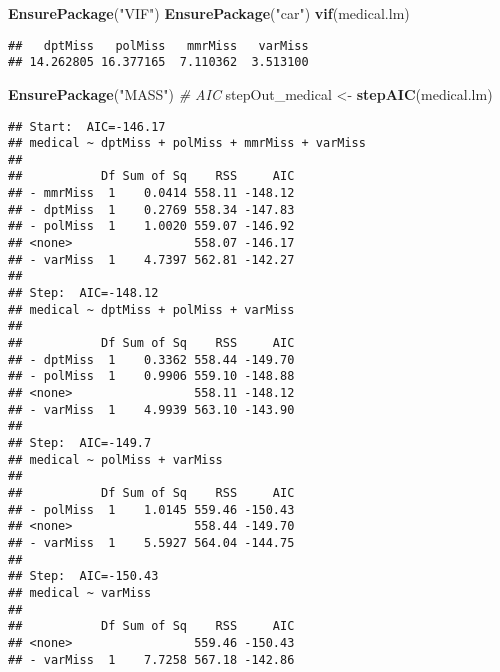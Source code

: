 \documentclass[]{article}
\newenvironment{Shaded}{\begin{snugshade}}{\end{snugshade}}
\newcommand{\CommentTok}[1]{\textcolor[rgb]{0.56,0.35,0.01}{\textit{#1}}}
\newcommand{\KeywordTok}[1]{\textcolor[rgb]{0.13,0.29,0.53}{\textbf{#1}}}
\newcommand{\NormalTok}[1]{#1}
\newcommand{\OperatorTok}[1]{\textcolor[rgb]{0.81,0.36,0.00}{\textbf{#1}}}
\newcommand{\StringTok}[1]{\textcolor[rgb]{0.31,0.60,0.02}{#1}}
\begin{document}
\begin{Shaded}
\begin{Highlighting}[]
\KeywordTok{EnsurePackage}\NormalTok{(}\StringTok{"VIF"}\NormalTok{)}
\KeywordTok{EnsurePackage}\NormalTok{(}\StringTok{"car"}\NormalTok{)}
\KeywordTok{vif}\NormalTok{(medical.lm)}
\end{Highlighting}
\end{Shaded}

\begin{verbatim}
##   dptMiss   polMiss   mmrMiss   varMiss 
## 14.262805 16.377165  7.110362  3.513100
\end{verbatim}

\begin{Shaded}
\begin{Highlighting}[]
\KeywordTok{EnsurePackage}\NormalTok{(}\StringTok{"MASS"}\NormalTok{) }\CommentTok{# AIC}
\NormalTok{stepOut_medical <-}\StringTok{ }\KeywordTok{stepAIC}\NormalTok{(medical.lm)}
\end{Highlighting}
\end{Shaded}

\begin{verbatim}
## Start:  AIC=-146.17
## medical ~ dptMiss + polMiss + mmrMiss + varMiss
## 
##           Df Sum of Sq    RSS     AIC
## - mmrMiss  1    0.0414 558.11 -148.12
## - dptMiss  1    0.2769 558.34 -147.83
## - polMiss  1    1.0020 559.07 -146.92
## <none>                 558.07 -146.17
## - varMiss  1    4.7397 562.81 -142.27
## 
## Step:  AIC=-148.12
## medical ~ dptMiss + polMiss + varMiss
## 
##           Df Sum of Sq    RSS     AIC
## - dptMiss  1    0.3362 558.44 -149.70
## - polMiss  1    0.9906 559.10 -148.88
## <none>                 558.11 -148.12
## - varMiss  1    4.9939 563.10 -143.90
## 
## Step:  AIC=-149.7
## medical ~ polMiss + varMiss
## 
##           Df Sum of Sq    RSS     AIC
## - polMiss  1    1.0145 559.46 -150.43
## <none>                 558.44 -149.70
## - varMiss  1    5.5927 564.04 -144.75
## 
## Step:  AIC=-150.43
## medical ~ varMiss
## 
##           Df Sum of Sq    RSS     AIC
## <none>                 559.46 -150.43
## - varMiss  1    7.7258 567.18 -142.86
\end{verbatim}

\begin{Shaded}
\end{Shaded}
\end{document}
